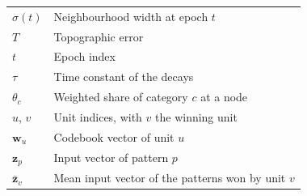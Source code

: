 \documentclass[conference,10pt]{IEEEtran}
\begin{document}
\begin{table}[H]
\begin{tabular}{lp{}}
$\sigma(t)$ & Neighbourhood width at epoch $t$ \\
$T$ & Topographic error \\
$t$ & Epoch index \\
$\tau$ & Time constant of the decays \\
$\theta_c$ & Weighted share of category $c$ at a node \\
$u$, $v$ & Unit indices, with $v$ the winning unit \\
$\mathbf{w}_u$ & Codebook vector of unit $u$ \\
$\mathbf{z}_p$ & Input vector of pattern $p$ \\
$\bar{\mathbf{z}}_v$ & Mean input vector of the patterns won by unit $v$ \\
\bottomrule
\end{tabular}
\end{table}
\end{document}
